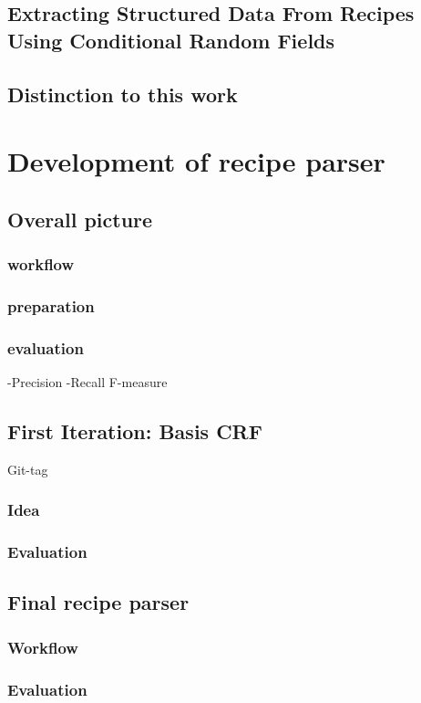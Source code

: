 \documentclass[12pt, twoside]{report}
\begin{document}
\section{Extracting Structured Data From Recipes Using Conditional Random Fields}

\section{Distinction to this work}



\chapter{Development of recipe parser}

\section{Overall picture}
\subsection{workflow}
\subsection{preparation}
\subsection{evaluation}
-Precision -Recall F-measure

\section{First Iteration: Basis CRF}
Git-tag
\subsection{Idea}
\subsection{Evaluation}

\section{Final recipe parser}
\subsection{Workflow}
\subsection{Evaluation}
\end{document}
